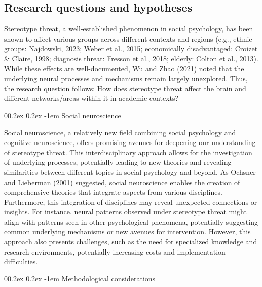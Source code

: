 \documentclass[
  stu, a4paper,floatsintext]{apa7}
\makeatletter
\let\oldparagraph\paragraph
\renewcommand{\paragraph}[1]{\oldparagraph{#1}\mbox{}}
\renewcommand{\paragraph}{\@startsection{paragraph}{4}{\parindent}%
  {0\baselineskip \@plus 0.2ex \@minus 0.2ex}%
  {-1em}%
  {\normalfont\normalsize\bfseries\itshape\typesectitle}}
\renewcommand{\paragraph}{\@startsection{paragraph}{4}{\parindent}%
  {0\baselineskip \@plus 0.2ex \@minus 0.2ex}%
  {-1em}%
  {\normalfont\normalsize\bfseries\typesectitle}}
\makeatother
\begin{document}
\subsection{Research questions and hypotheses}\label{research-questions-and-hypotheses}

Stereotype threat, a well-established phenomenon in social psychology, has been shown to affect various groups across different contexts and regions (e.g., ethnic groups: Najdowski, 2023; Weber et al., 2015; economically disadvantaged: Croizet \& Claire, 1998; diagnosis threat: Fresson et al., 2018; elderly: Colton et al., 2013).
While these effects are well-documented, Wu and Zhao (2021) noted that the underlying neural processes and mechanisms remain largely unexplored.
Thus, the research question follows: How does stereotype threat affect the brain and different networks/areas within it in academic contexts?

\paragraph{Social neuroscience}\label{social-neuroscience}

Social neuroscience, a relatively new field combining social psychology and cognitive neuroscience, offers promising avenues for deepening our understanding of stereotype threat.
This interdisciplinary approach allows for the investigation of underlying processes, potentially leading to new theories and revealing similarities between different topics in social psychology and beyond. As Ochsner and Lieberman (2001) suggested, social neuroscience enables the creation of comprehensive theories that integrate aspects from various disciplines.
Furthermore, this integration of disciplines may reveal unexpected connections or insights. For instance, neural patterns observed under stereotype threat might align with patterns seen in other psychological phenomena, potentially suggesting common underlying mechanisms or new avenues for intervention.
However, this approach also presents challenges, such as the need for specialized knowledge and research environments, potentially increasing costs and implementation difficulties.

\paragraph{Methodological considerations}\label{methodological-considerations}
\end{document}
